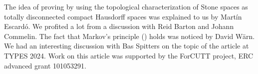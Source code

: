 The idea of proving  by using the topological characterization of Stone spaces as totally disconnected compact Hausdorff spaces was explained to us by Martín Escardó.
We profited a lot from a discussion with Reid Barton and Johann Commelin. 
The fact that Markov's principle () holds was noticed by David Wärn. 
We had an interesting discussion with Bas Spitters on the topic of the article at TYPES 2024.
Work on this article was supported by the ForCUTT project, ERC advanced grant 101053291.
